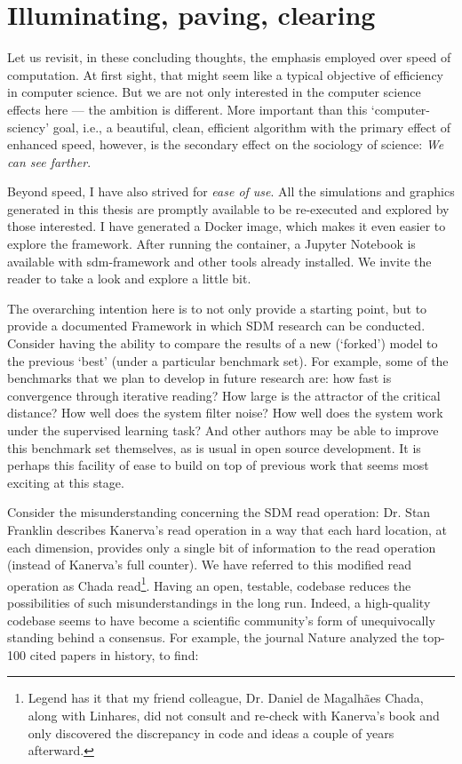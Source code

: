 \section{Illuminating, paving, clearing}

Let us revisit, in these concluding thoughts, the emphasis employed over speed of computation.  At first sight, that might seem like a typical objective of efficiency in computer science. But we are not only interested in the computer science effects here --- the ambition is different. More important than this `computer-sciency' goal, i.e., a beautiful, clean, efficient algorithm with the primary effect of enhanced speed, however, is the secondary effect on the sociology of science:  \emph{We can see farther}.


Beyond speed, I have also strived for \emph{ease of use}.  All the simulations and graphics generated in this thesis are promptly available to be re-executed and explored by those interested. I have generated a Docker image, which makes it even easier to explore the framework. After running the container, a Jupyter Notebook is available with sdm-framework and other tools already installed. We invite the reader to take a look and explore a little bit.

The overarching intention here is to not only provide a starting point, but to provide a documented Framework in which SDM research can be conducted.  Consider having the ability to compare the results of a new (‘forked’) model to the previous `best' (under a particular benchmark set).  For example, some of the benchmarks that we plan to develop in future research are: how fast is convergence through iterative reading?  How large is the attractor of the critical distance?  How well does the system filter noise?  How well does the system work under the supervised learning task?  And other authors may be able to improve this benchmark set themselves, as is usual in open source development.  It is perhaps this facility of ease to build on top of previous work that seems most exciting at this stage.

Consider the misunderstanding concerning the SDM read operation:  Dr. Stan Franklin describes Kanerva's read operation in a way that each hard location, at each dimension, provides only a single bit of information to the read operation (instead of Kanerva's full counter).  We have referred to this modified read operation as Chada read\footnote{Legend has it that my friend \text{\&} colleague, Dr. Daniel de Magalhães Chada, along with Linhares, did not consult and re-check with Kanerva's book and only discovered the discrepancy in code and ideas a couple of years afterward.}.  Having an open, testable, codebase reduces the possibilities of such misunderstandings in the long run.  Indeed, a high-quality codebase seems to have become a scientific community's form of unequivocally standing behind a consensus. For example, the journal Nature analyzed the top-100 cited papers in history, to find:

